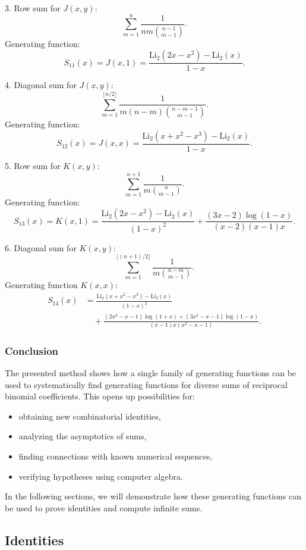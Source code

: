 \documentclass[12pt]{article}
\newcommand{\Li}{\mathrm{Li}_2} %
\begin{document}
3. Row sum for \( J(x,y) \):
   \[
   \sum_{m=1}^{n} \frac{1}{n m \binom{n-1}{m-1}}.
   \]
   Generating function:
   \[
   S_{11}(x) = J(x, 1) = \frac{\Li(2x - x^2) - \Li(x)}{1-x}.
   \]

4. Diagonal sum for \( J(x,y) \):
   \[
   \sum_{m=1}^{\lfloor n/2 \rfloor} \frac{1}{m (n-m) \binom{n-m-1}{m-1}}.
   \]
   Generating function:
   \[
   S_{12}(x) = J(x, x) = \frac{\Li(x + x^2 - x^3) - \Li(x)}{1-x}.
   \]

5. Row sum for \( K(x,y) \):
   \[
   \sum_{m=1}^{n+1} \frac{1}{m \binom{n}{m-1}}.
   \]
   Generating function:
   \[
   S_{13}(x) = K(x, 1) =
   \frac{\Li(2x - x^2) - \Li(x)}{(1-x)^2}
   + \frac{(3x-2)\log(1-x)}{(x-2)(x-1)x}.
   \]

6. Diagonal sum for \( K(x,y) \):
   \[
   \sum_{m=1}^{\lfloor (n+1)/2 \rfloor} \frac{1}{m \binom{n-m}{m-1}}.
   \]
   Generating function $K(x, x)$:
   \[
\begin{aligned}
   S_{14}(x) &= \frac{\Li(x + x^2 - x^3) - \Li(x)}{(1-x)^2} \\
   &\quad + \frac{(2x^2-x-1)\log(1+x) + (3x^2-x-1)\log(1-x)}{(x-1)x(x^2-x-1)}.
\end{aligned}
\]

\subsubsection{Conclusion}

The presented method shows how a single family of generating functions can be used to systematically find generating functions for diverse sums of reciprocal binomial coefficients. This opens up possibilities for:
\begin{itemize}
\item obtaining new combinatorial identities,
\item analyzing the asymptotics of sums,
\item finding connections with known numerical sequences,
\item verifying hypotheses using computer algebra.
\end{itemize}

In the following sections, we will demonstrate how these generating functions can be used to prove identities and compute infinite sums.

\subsection{Identities}
\end{document}
